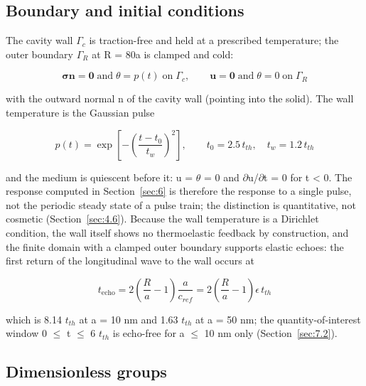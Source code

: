 \documentclass[preprint,12pt]{elsarticle}
\begin{document}
\subsection{Boundary and initial conditions}
\label{sec:2.6}

The cavity wall $\Gamma_{c}$ is traction-free and held at a prescribed temperature; the outer boundary $\Gamma_{R}$ at R = 80a is clamped and cold:

\begin{equation}
\boldsymbol{\sigma}\mathbf{n}=\mathbf{0}\;\text{and}\;\theta=p(t)\;\text{on}\;\Gamma_c,\qquad \mathbf{u}=\mathbf{0}\;\text{and}\;\theta=0\;\text{on}\;\Gamma_R 
\label{eq:29}
\end{equation}

with the outward normal n of the cavity wall (pointing into the solid). The wall temperature is the Gaussian pulse

\begin{equation}
p(t)=\exp\left[-\left(\frac{t-t_0}{t_w}\right)^2\right],\qquad t_0=2.5\,t_{th},\quad t_w=1.2\,t_{th} 
\label{eq:30}
\end{equation}

and the medium is quiescent before it: u = $\theta$ = 0 and $\partial$u/$\partial$t = 0 for t < 0. The response computed in Section~\ref{sec:6} is therefore the response to a single pulse, not the periodic steady state of a pulse train; the distinction is quantitative, not cosmetic (Section~\ref{sec:4.6}). Because the wall temperature is a Dirichlet condition, the wall itself shows no thermoelastic feedback by construction, and the finite domain with a clamped outer boundary supports elastic echoes: the first return of the longitudinal wave to the wall occurs at

\begin{equation}
t_{\mathrm{echo}}=2\left(\frac{R}{a}-1\right)\frac{a}{c_{ref}}=2\left(\frac{R}{a}-1\right)\epsilon\,t_{th} 
\label{eq:31}
\end{equation}

which is 8.14 $t_{th}$ at a = 10 nm and 1.63 $t_{th}$ at a = 50 nm; the quantity-of-interest window 0 $\leq$ t $\leq$ 6 $t_{th}$ is echo-free for a $\leq$ 10 nm only (Section~\ref{sec:7.2}).

\subsection{Dimensionless groups}
\label{sec:2.7}
\end{document}
